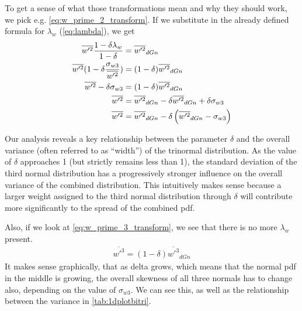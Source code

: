 To get a sense of what those transformations mean and why they should work, we pick e.g. \cref{eq:w_prime_2_transform}.
If we substitute in the already defined formula for $\lambda_w$ (\cref{eq:lambda}), we get
\begin{align*}
    \overline{w'^2} \frac{1 - \delta\lambda_w}{1 - \delta}
    &= \overline{w'^2}_{dGn} \\
    \overline{w'^2} (1 - \delta\frac{\sigma_{w 3}}{\overline{w'^2}})
    &= (1 - \delta)\overline{w'^2}_{dGn} \\
    \overline{w'^2} - \delta\sigma_{w 3}
    &= (1 - \delta)\overline{w'^2}_{dGn} \\
    \overline{w'^2}
    &= \overline{w'^2}_{dGn} - \delta\overline{w'^2}_{dGn} + \delta\sigma_{w 3} \\
    \overline{w'^2}
    &= \overline{w'^2}_{dGn} - \delta\left(\overline{w'^2}_{dGn} - \sigma_{w 3}\right)
\end{align*}

Our analysis reveals a key relationship between the parameter $\delta$
and the overall variance (often referred to as \enquote{width}) of the trinormal distribution.
As the value of $\delta$ approaches 1 (but strictly remains less than 1),
the standard deviation of the third normal distribution
has a progressively stronger influence on the overall variance of the combined distribution.
This intuitively makes sense because a larger weight assigned to the third normal distribution through $\delta$
will contribute more significantly to the spread of the combined \gls{pdf}.

Also, if we look at \cref{eq:w_prime_3_transform}, we see that there is no more $\lambda_w$ present.
\begin{align*}
    \overline{w'^3} = (1 - \delta)\overline{w'^3}_{dGn}
\end{align*}
It makes sense graphically, that as delta grows,
which means that the normal \gls{pdf} in the middle is growing,
the overall skewness of all three normals has to change also, depending on the value of $\sigma_{w 3}$.
We can see this, as well as the relationship between the variance in \autoref{tab:1dplotbitri}.

